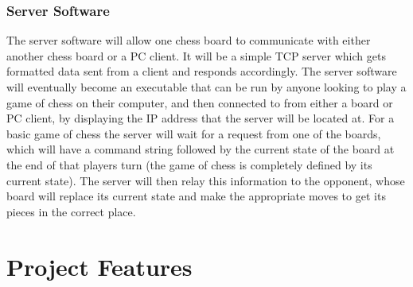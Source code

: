 \documentclass{article}
\begin{document}
\subsubsection*{Server Software}
\indent

The server software will allow one chess board to communicate with either another chess board or a PC client. It will be a simple TCP server which gets formatted data sent from a client and responds accordingly. The server software will eventually become an executable that can be run by anyone looking to play a game of chess on their computer, and then connected to from either a board or PC client, by displaying the IP address that the server will be located at. For a basic game of chess the server will wait for a request from one of the boards, which will have a command string followed by the current state of the board at the end of that players turn (the game of chess is completely defined by its current state). The server will then relay this information to the opponent, whose board will replace its current state and make the appropriate moves to get its pieces in the correct place.


\section*{Project Features}
\end{document}
